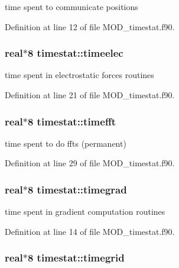 time spent to communicate positions 



Definition at line 12 of file M\-O\-D\-\_\-timestat.\-f90.

\hypertarget{classtimestat_a7a1804f574585aa42019ec284de7ec14}{
\subsubsection[{timeelec}]{\setlength{\rightskip}{0pt plus 5cm}real$\ast$8 timestat\-::timeelec}}\label{classtimestat_a7a1804f574585aa42019ec284de7ec14}


time spent in electrostatic forces routines 



Definition at line 21 of file M\-O\-D\-\_\-timestat.\-f90.

\hypertarget{classtimestat_aeea025c909fbadaa04547e05c618e89e}{
\subsubsection[{timefft}]{\setlength{\rightskip}{0pt plus 5cm}real$\ast$8 timestat\-::timefft}}\label{classtimestat_aeea025c909fbadaa04547e05c618e89e}


time spent to do ffts (permanent) 



Definition at line 29 of file M\-O\-D\-\_\-timestat.\-f90.

\hypertarget{classtimestat_a551bee3c78f6e422ca3e7ece6c0418b0}{
\subsubsection[{timegrad}]{\setlength{\rightskip}{0pt plus 5cm}real$\ast$8 timestat\-::timegrad}}\label{classtimestat_a551bee3c78f6e422ca3e7ece6c0418b0}


time spent in gradient computation routines 



Definition at line 14 of file M\-O\-D\-\_\-timestat.\-f90.

\hypertarget{classtimestat_af5098b97a125bfdf3477ad304323ab46}{
\subsubsection[{timegrid}]{\setlength{\rightskip}{0pt plus 5cm}real$\ast$8 timestat\-::timegrid}}\label{classtimestat_af5098b97a125bfdf3477ad304323ab46}


